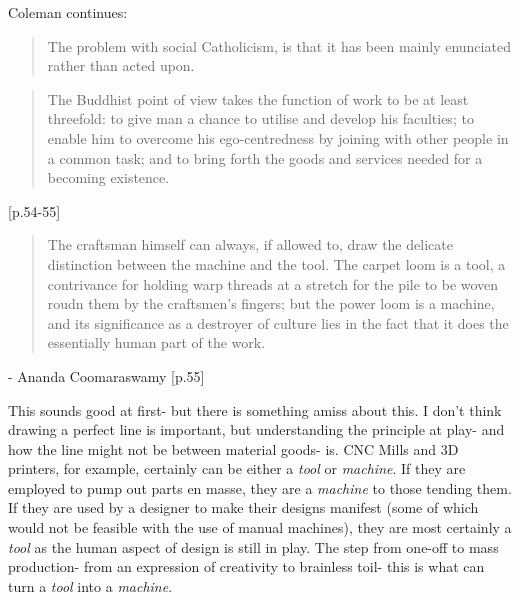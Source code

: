 \documentclass[10pt,letterpaper,openany]{book}
\begin{document}

Coleman continues:

\begin{quote}
The problem with social Catholicism, is that it has been mainly enunciated rather than acted upon.
\end{quote}










\begin{quote}
The Buddhist point of view takes the function of work to be at least threefold: to give man a chance to utilise and develop his faculties; to enable him to overcome his ego-centredness by joining with other people in a common task; and to bring forth the goods and services needed for a becoming existence.
\end{quote} [p.54-55]

\begin{quote}
The craftsman himself can always, if allowed to, draw the delicate distinction between the machine and the tool. The carpet loom is a tool, a contrivance for holding warp threads at a stretch for the pile to be woven roudn them by the craftsmen's fingers; but the power loom is a machine, and its significance as a destroyer of culture lies in the fact that it does the essentially human part of the work.
\end{quote} - Ananda Coomaraswamy [p.55]

This sounds good at first- but there is something amiss about this. I don't think drawing a perfect line is important, but understanding the principle at play- and how the line might not be between material goods- is. CNC Mills and 3D printers, for example, certainly can be either a \textit{tool} or \textit{machine}. If they are employed to pump out parts en masse, they are a \textit{machine} to those tending them. If they are used by a designer to make their designs manifest (some of which would not be feasible with the use of manual machines), they are most certainly a \textit{tool} as the human aspect of design is still in play. The step from one-off to mass production- from an expression of creativity to brainless toil- this is what can turn a \textit{tool} into a \textit{machine}.
\end{document}
